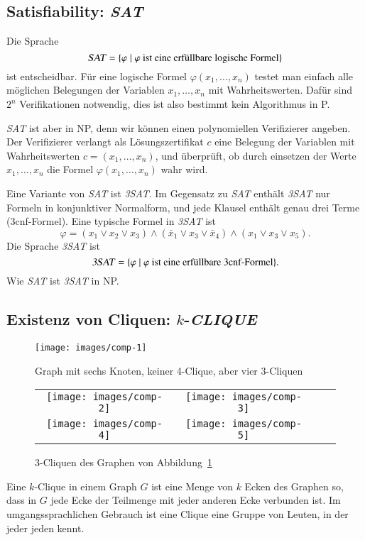 \subsection{Satisfiability: \textsl{SAT}}
%
%
Die Sprache 
\[
\text{\textsl{SAT}}=\{\varphi\;|\;\text{$\varphi$ ist eine erfüllbare logische Formel}\}
\]
ist entscheidbar.
Für eine logische Formel $\varphi(x_1,\dots,x_n)$
testet man einfach alle möglichen Belegungen der Variablen $x_1,\dots,x_n$
mit Wahrheitswerten.
Dafür sind $2^n$ Verifikationen notwendig, dies ist also
bestimmt kein Algorithmus in P.

\textsl{SAT} ist aber in NP,
denn wir können einen polynomiellen Verifizierer angeben.
Der Verifizierer verlangt als Lösungszertifikat $c$ eine
Belegung der Variablen mit Wahrheitswerten $c=(x_1,\dots,x_n)$,
und überprüft, ob durch einsetzen der Werte $x_1,\dots,x_n$
die Formel $\varphi(x_1,\dots,x_n)$ wahr wird.

Eine Variante von \textsl{SAT} ist \textsl{3SAT}.
Im Gegensatz zu \textsl{SAT} enthält \textsl{3SAT}
nur Formeln in konjunktiver Normalform, und jede Klausel
enthält genau drei Terme (3cnf-Formel).
Eine typische Formel in \textsl{3SAT} ist 
\[
\varphi=(x_1\vee x_2\vee x_3)\wedge (\bar x_1\vee x_3\vee \bar x_4)\wedge
	(x_1\vee x_3\vee x_5).
\]
Die Sprache \textsl{3SAT} ist
\[
\text{\textsl{3SAT}} =\{\varphi\;|\; \text{$\varphi$ ist eine erfüllbare 3cnf-Formel}\}.
\]
Wie \textsl{SAT} ist \textsl{3SAT} in NP.

\subsection{Existenz von Cliquen: \texorpdfstring{$k$}{k}-\textsl{CLIQUE}}
\begin{figure}
\begin{center}
\texttt{[image: images/comp-1]}
\end{center}
\caption{Graph mit sechs Knoten, keiner 4-Clique, aber
vier 3-Cliquen\label{6graph}}
\end{figure}%
\begin{figure}
\begin{center}
\begin{tabular}{cccc}
\texttt{[image: images/comp-2]}&%
\texttt{[image: images/comp-3]}\\
\texttt{[image: images/comp-4]}&%
\texttt{[image: images/comp-5]}
\end{tabular}
\end{center}
\caption{3-Cliquen des Graphen von Abbildung~\ref{6graph}}
\end{figure}%
%
%
%
%
Eine $k$-Clique in einem Graph $G$ ist eine Menge von $k$
Ecken des Graphen so, dass in $G$ jede Ecke der Teilmenge mit
jeder anderen Ecke verbunden ist.
Im umgangssprachlichen Gebrauch
ist eine Clique eine Gruppe von Leuten, in der jeder jeden kennt.

